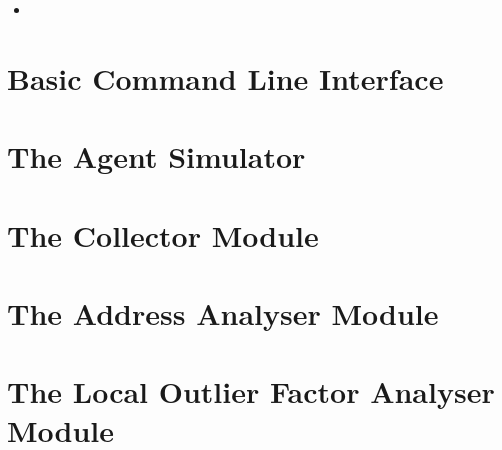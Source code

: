 
\begin{itemize}
	\item 
\end{itemize}

\section{Basic Command Line Interface}

\section{The Agent Simulator}

\section{The Collector Module}

\section{The Address Analyser Module}

\section{The Local Outlier Factor Analyser Module}

